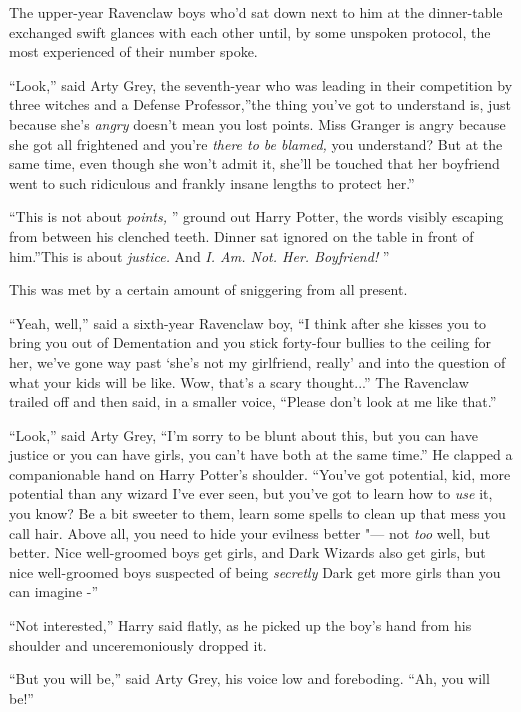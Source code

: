 The upper-year Ravenclaw boys who'd sat down next to him at the
dinner-table exchanged swift glances with each other until, by some
unspoken protocol, the most experienced of their number spoke.

``Look,'' said Arty Grey, the seventh-year who was leading in their
competition by three witches and a Defense Professor,''the thing you've
got to understand is, just because she's \emph{angry} doesn't mean you
lost points. Miss Granger is angry because she got all frightened and
you're \emph{there to be blamed,} you understand? But at the same time,
even though she won't admit it, she'll be touched that her boyfriend
went to such ridiculous and frankly insane lengths to protect her.''

``This is not about \emph{points,} '' ground out Harry Potter, the words
visibly escaping from between his clenched teeth. Dinner sat ignored on
the table in front of him.''This is about \emph{justice.} And \emph{I.
Am. Not. Her. Boyfriend!} ''

This was met by a certain amount of sniggering from all present.

``Yeah, well,'' said a sixth-year Ravenclaw boy, ``I think after she
kisses you to bring you out of Dementation and you stick forty-four
bullies to the ceiling for her, we've gone way past `she's not my
girlfriend, really' and into the question of what your kids will be
like. Wow, that's a scary thought...'' The Ravenclaw trailed off
and then said, in a smaller voice, ``Please don't look at me like
that.''

``Look,'' said Arty Grey, ``I'm sorry to be blunt about this, but you
can have justice or you can have girls, you can't have both at the same
time.'' He clapped a companionable hand on Harry Potter's shoulder.
``You've got potential, kid, more potential than any wizard I've ever
seen, but you've got to learn how to \emph{use} it, you know? Be a bit
sweeter to them, learn some spells to clean up that mess you call hair.
Above all, you need to hide your evilness better "--- not \emph{too} well,
but better. Nice well-groomed boys get girls, and Dark Wizards also get
girls, but nice well-groomed boys suspected of being \emph{secretly}
Dark get more girls than you can imagine -''

``Not interested,'' Harry said flatly, as he picked up the boy's hand
from his shoulder and unceremoniously dropped it.

``But you will be,'' said Arty Grey, his voice low and foreboding. ``Ah,
you will be!''

